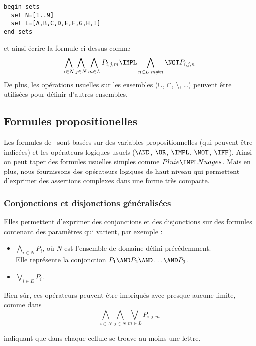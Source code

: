 \begin{verbatim}
begin sets
  set N=[1..9]
  set L=[A,B,C,D,E,F,G,H,I]
end sets
\end{verbatim}

et ainsi \'ecrire la formule ci-dessus comme
$$\bigwedge_{i \in N} \bigwedge_{j \in N}\bigwedge_{ m\in L}P_{i,j,m}\IMPL \bigwedge_{n \in L|m\neq n}\NOT P_{i,j,n}$$
De plus, les op\'erations usuelles sur les ensembles ($\cup$, $\cap$, $\setminus$, \ldots) peuvent \^etre utilis\'ees pour d\'efinir d'autres ensembles.


\subsection{Formules propositionelles}

Les formules de \nameTool\ sont bas\'ees sur des variables propositionnelles (qui peuvent \^etre indic\'ees) et les op\'erateurs logiques usuels ($\AND$, $\OR$, $\IMPL$, $\NOT$, $\IFF$). Ainsi on peut taper des formules usuelles simples comme $Pluie \IMPL Nuages$. Mais en plus, nous fournissons des op\'erateurs logiques de haut niveau qui permettent d'exprimer des assertions complexes dans une forme tr\`es compacte.

\subsubsection*{Conjonctions et disjonctions g\'en\'eralis\'ees}
Elles permettent d'exprimer des conjonctions et des disjonctions sur des formules contenant des param\`etres qui varient, par exemple :
\begin{itemize}
\item $ \bigwedge_{i \in N} P_i$, o\`u $N$ est l'ensemble de domaine d\'efini pr\'ec\'edemment.\\
  Elle repr\'esente la conjonction
  $P_1 \AND P_2 \AND \ldots \AND P_9$. 
\item $\bigvee_{i \in E} P_i$.
\end{itemize}

Bien s\^ur, ces op\'erateurs peuvent \^etre imbriqu\'es avec presque aucune limite, comme dans
$$\bigwedge_{i \in N} \bigwedge_{j \in N}\bigvee_{ m\in L}P_{i,j,m}$$

indiquant que dans chaque cellule se trouve au moins une lettre.


